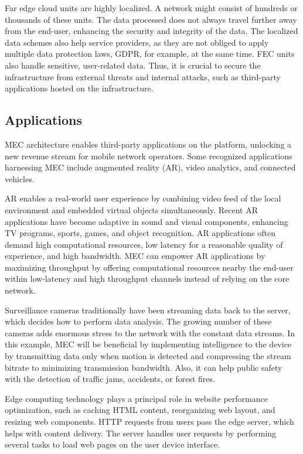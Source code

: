 Far edge cloud units are highly localized. A network might consist of hundreds or thousands of these units. The data processed does not always travel further away from the end-user, enhancing the security and integrity of the data. The localized data schemes also help service providers, as they are not obliged to apply multiple data protection laws, GDPR, for example, at the same time. FEC units also handle sensitive, user-related data. Thus, it is crucial to secure the infrastructure from external threats and internal attacks, such as third-party applications hosted on the infrastructure.

\subsection{Applications}
\label{subs:applications}

MEC architecture enables third-party applications on the platform, unlocking a new revenue stream for mobile network operators. Some recognized applications harnessing MEC include augmented reality (AR), video analytics, and connected vehicles.

AR enables a real-world user experience by combining video feed of the local environment and embedded virtual objects simultaneously. Recent AR applications have become adaptive in sound and visual components, enhancing TV programs, sports, games, and object recognition. AR applications often demand high computational resources, low latency for a reasonable quality of experience, and high bandwidth. MEC can empower AR applications by maximizing throughput by offering computational resources nearby the end-user within low-latency and high throughput channels instead of relying on the core network. \cite{Abbas2018}

Surveillance cameras traditionally have been streaming data back to the server, which decides how to perform data analysis. The growing number of these cameras adds enormous stress to the network with the constant data streams. In this example, MEC will be beneficial by implementing intelligence to the device by transmitting data only when motion is detected and compressing the stream bitrate to minimizing transmission bandwidth. Also, it can help public safety with the detection of traffic jams, accidents, or forest fires.

Edge computing technology plays a principal role in website performance optimization, such as caching HTML content, reorganizing web layout, and resizing web components. HTTP requests from users pass the edge server, which helps with content delivery. The server handles user requests by performing several tasks to load web pages on the user device interface. \cite{Abbas2018}

